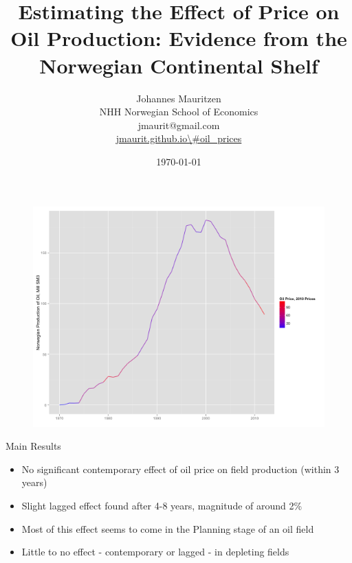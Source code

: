 \documentclass{beamer}
\title[oil]{Estimating the Effect of Price on Oil Production: Evidence from the Norwegian Continental Shelf}
\author[Mauritzen]{Johannes Mauritzen \\ NHH Norwegian School of Economics \\
jmaurit@gmail.com \\
\url{jmaurit.github.io\\#oil\_prices}}
\institute[NHH]{
}
\date{\today}
\begin{document}
\begin{frame}[plain]
  \titlepage
\end{frame}

\begin{frame}
	\begin{figure}
	\includegraphics[width=1\textwidth]{figures/oil_decline.png}
	\label{oil_decline}
\end{figure}
\end{frame}

\begin{frame}[plain]
	Main Results
	\begin{itemize}
		\item No significant contemporary effect of oil price on field production (within 3 years)
		\item Slight lagged effect found after 4-8 years, magnitude of around 2\%
		\item Most of this effect seems to come in the Planning stage of an oil field
		\item Little to no effect - contemporary or lagged - in depleting fields
	\end{itemize}
\end{frame}
\end{document}

